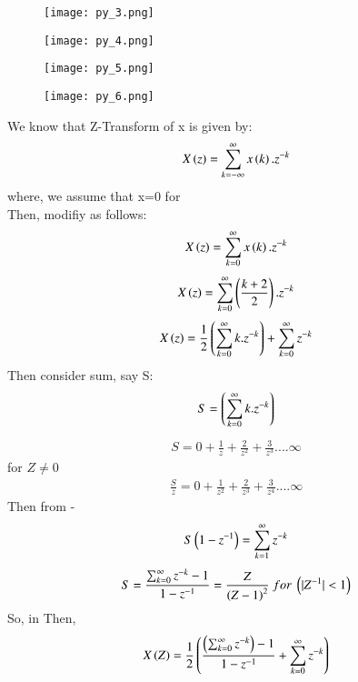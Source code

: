 \documentclass[beamer]{IEEEtran}
\theoremstyle{remark}
\begin{document}
\begin{figure}[h]
    \centering
    \texttt{[image: py\_3.png]}
    \label{fig:enter-label}
\end{figure}

\begin{figure}[h]
    \centering
    \texttt{[image: py\_4.png]}
    \label{fig:enter-label}
\end{figure}

\begin{figure}[h]
    \centering
    \texttt{[image: py\_5.png]}
    \label{fig:enter-label}
\end{figure}

\begin{figure}[h]
    \centering
    \texttt{[image: py\_6.png]}
    \label{fig:enter-label}
\end{figure}
We know that Z-Transform of x is given by:
\begin{align}
\label{q11}
    X\left(z\right)=\sum_{k=-\infty}^{\infty} x\left(k\right).z^{-k}
\end{align}
where, we assume that x=0   for \\
Then, \brak{\ref{q11}} modifiy as follows:
\begin{align}
\label{q12}
    X\left(z\right)=\sum_{k=0}^{\infty} x\left(k\right).z^{-k}
\end{align}
$$X\left(z\right)=\sum_{k=0}^{\infty} \left(\frac{k+2}{2}\right).z^{-k}$$
\begin{align}
    \label{q13}
    X\left(z\right)=\frac{1}{2}\left(\sum_{k=0}^{\infty}k.z^{-k}\right)+\sum_{k=0}^{\infty}z^{-k}
\end{align}
Then consider sum, say S:
$$S=\left(\sum_{k=0}^{\infty}k.z^{-k}\right)$$
\begin{align}
\label{q14}
S=0+\frac{1}{z}+\frac{2}{z^2}+\frac{3}{z^3}....\infty
\end{align}
for $Z\neq 0$
\begin{align}
\label{q15}
\frac{S}{z}=0+\frac{1}{z^2}+\frac{2}{z^3}+\frac{3}{z^4}....\infty
\end{align}
Then from \brak{\ref{q15}}-\brak{\ref{q11}}
$$S\left(1-z^{-1}\right)=\sum_{k=1}^{\infty}z^{-k}$$
\begin{align}
\label{q16}
    S=\frac{\sum_{k=0}^{\infty}z^{-k}-1}{1-z^{-1}}=\frac{Z}{\brak{Z-1}^2}\ for\ \brak{|Z^{-1}|<1}
\end{align}
So,\brak{\ref{q16}} in \brak{\ref{q13}} Then,
$$X\left(Z\right)=\frac{1}{2}\left(\frac{\left(\sum_{k=0}^{\infty}z^{-k}\right)-1}{1-z^{-1}}+\sum_{k=0}^{\infty}z^{-k}\right)$$
\end{document}
